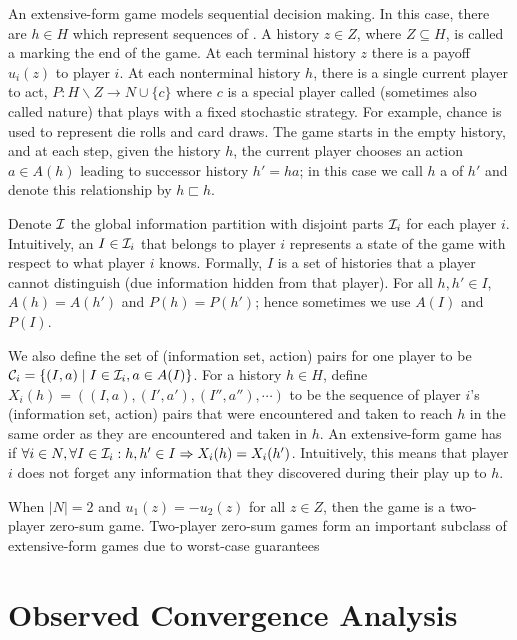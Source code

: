 \documentclass{aamas2013}
\begin{document}
An extensive-form game models sequential decision making. In this case, there are  $h \in H$ which represent
sequences of . A history $z \in Z$, where $Z \subseteq H$, is called a  marking the end of the 
game. At each terminal history $z$ there is a payoff $u_i(z)$ to player $i$. At each nonterminal history $h$, there is a single 
current player to act, $P: H \backslash Z \rightarrow N \cup \{ c \}$ where $c$ is a special player called 
(sometimes also called nature) that plays with a fixed stochastic strategy. For example, chance is used to represent die rolls 
and card draws. The game starts in the empty history, and 
at each step, given the history $h$, the current player chooses an action $a \in A(h)$ leading to successor history $h' = ha$;
in this case we call $h$ a  of $h'$ and denote this relationship by $h \sqsubset h$.

Denote $\mathcal{I}$ the global information partition with disjoint parts $\mathcal{I}_i$ for each player $i$. Intuitively, an  
$I \in \mathcal{I}_i$ that belongs to player $i$ represents a state of the game with respect to what player $i$ knows. 
Formally, $I$ is a set of histories that a player cannot distinguish (due information hidden from that player). For all 
$h,h' \in I$, $A(h) = A(h')$ and $P(h) = P(h')$; hence sometimes we use $A(I)$ and $P(I)$. 

We also define the set of (information set, action) pairs for one player to be
$\mathcal{C}_i = \{ (I,a) \mid I \in \mathcal{I}_i, a \in A(I) \}$.
For a history $h \in H$, define
$X_i(h) = ((I,a), (I', a'), (I'', a''), \cdots)$ to be the sequence of player $i$'s (information set,
action) pairs that were encountered and taken to reach $h$ in the same order as they are encountered
and taken in $h$. An extensive-form game has  if
$\forall i \in N, \forall I \in \mathcal{I}_i : h, h' \in I \Rightarrow X_i(h) = X_i(h')$. Intuitively,
this means that player $i$ does not forget any information that they discovered during their play
up to $h$.

When $|N| = 2$ and $u_1(z) = -u_2(z)$ for all $z \in Z$, 
then the game is a two-player zero-sum game. Two-player zero-sum games form an important subclass of extensive-form games due to
worst-case guarantees 

\section{Observed Convergence Analysis}
\end{document}
